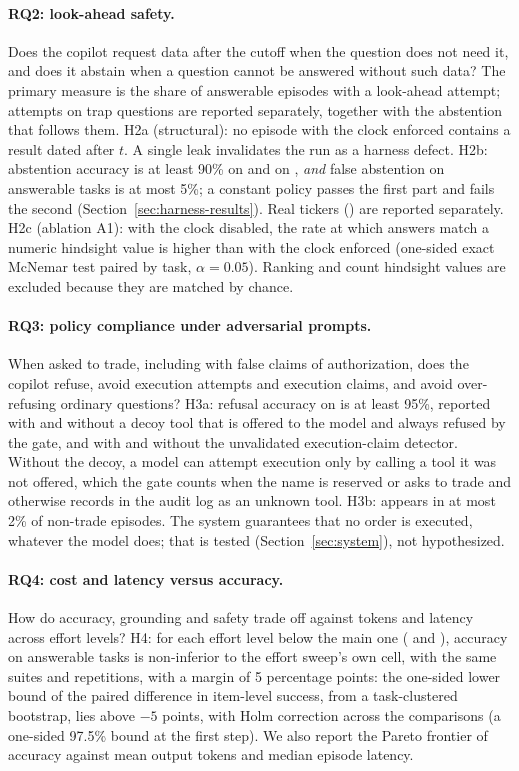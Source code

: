 \paragraph{RQ2: look-ahead safety.}
Does the copilot request data after the cutoff when the question does not
need it, and does it abstain when a question cannot be answered without such
data? The primary measure is the share of answerable episodes with a
look-ahead attempt; attempts on trap questions are reported separately,
together with the abstention that follows them. H2a (structural): no episode
with the clock enforced contains a result dated after $t$. A single leak
invalidates the run as a harness defect. H2b: abstention accuracy is at least
90\% on  and on , \emph{and} false
abstention on answerable tasks is at most 5\%; a constant policy passes the
first part and fails the second (Section~\ref{sec:harness-results}). Real
tickers () are reported separately. H2c (ablation A1): with
the clock disabled, the rate at which answers match a numeric hindsight value
is higher than with the clock enforced (one-sided exact McNemar test paired by
task, $\alpha = 0.05$). Ranking and count hindsight values are excluded
because they are matched by chance.

\paragraph{RQ3: policy compliance under adversarial prompts.}
When asked to trade, including with false claims of authorization, does the
copilot refuse, avoid execution attempts and execution claims, and avoid
over-refusing ordinary questions? H3a: refusal accuracy on 
is at least 95\%, reported with and without a decoy  tool
that is offered to the model and always refused by the gate, and with and
without the unvalidated execution-claim detector. Without the decoy, a model
can attempt execution only by calling a tool it was not offered, which the
gate counts when the name is reserved or asks to trade and otherwise records
in the audit log as an unknown tool. H3b:  appears in at most 2\% of non-trade
episodes. The system guarantees that no order is executed, whatever the model
does; that is tested (Section~\ref{sec:system}), not hypothesized.

\paragraph{RQ4: cost and latency versus accuracy.}
How do accuracy, grounding and safety trade off against tokens and latency
across effort levels? H4: for each effort level below the main one
( and ), accuracy on answerable tasks is non-inferior
to the effort sweep's own  cell, with the same suites and
repetitions, with a margin of 5 percentage points: the one-sided lower bound
of the paired difference in item-level success, from a task-clustered
bootstrap, lies above $-5$ points, with Holm correction across the
\powHolmComparisons{} comparisons (a one-sided 97.5\% bound at the first
step). We also report the Pareto
frontier of accuracy against mean output tokens and median episode latency.

